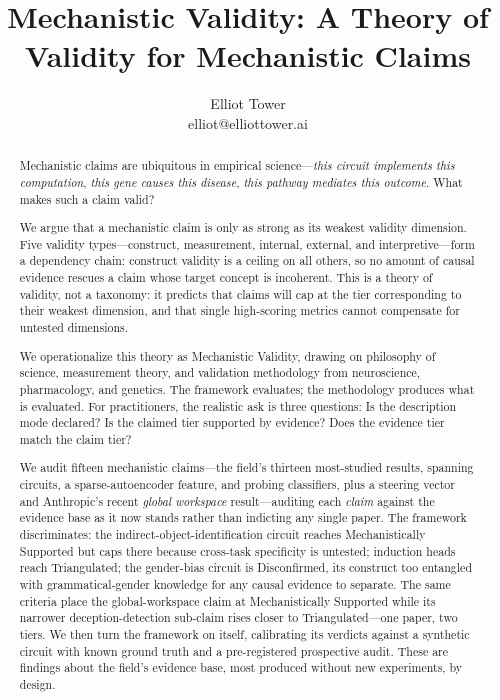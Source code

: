 \documentclass{article}
\title{Mechanistic Validity: A Theory of Validity for Mechanistic Claims}
\author{\name Elliot Tower \\
      \email elliot@elliottower.ai}
\begin{document}
\maketitle

\begin{abstract}
Mechanistic claims are ubiquitous in empirical science---\emph{this circuit implements this computation}, \emph{this gene causes this disease}, \emph{this pathway mediates this outcome}. What makes such a claim valid?

We argue that a mechanistic claim is only as strong as its weakest validity dimension. Five validity types---construct, measurement, internal, external, and interpretive---form a dependency chain: construct validity is a ceiling on all others, so no amount of causal evidence rescues a claim whose target concept is incoherent. This is a theory of validity, not a taxonomy: it predicts that claims will cap at the tier corresponding to their weakest dimension, and that single high-scoring metrics cannot compensate for untested dimensions.

We operationalize this theory as Mechanistic Validity, drawing on philosophy of science, measurement theory, and validation methodology from neuroscience, pharmacology, and genetics. The framework evaluates; the methodology produces what is evaluated. For practitioners, the realistic ask is three questions: Is the description mode declared? Is the claimed tier supported by evidence? Does the evidence tier match the claim tier?

We audit fifteen mechanistic claims---the field's thirteen most-studied results, spanning circuits, a sparse-autoencoder feature, and probing classifiers, plus a steering vector and Anthropic's recent \emph{global workspace} result---auditing each \emph{claim} against the evidence base as it now stands rather than indicting any single paper. The framework discriminates: the indirect-object-identification circuit reaches Mechanistically Supported but caps there because cross-task specificity is untested; induction heads reach Triangulated; the gender-bias circuit is Disconfirmed, its construct too entangled with grammatical-gender knowledge for any causal evidence to separate. The same criteria place the global-workspace claim at Mechanistically Supported while its narrower deception-detection sub-claim rises closer to Triangulated---one paper, two tiers. We then turn the framework on itself, calibrating its verdicts against a synthetic circuit with known ground truth and a pre-registered prospective audit. These are findings about the field's evidence base, most produced without new experiments, by design.
\end{abstract}
\end{document}
